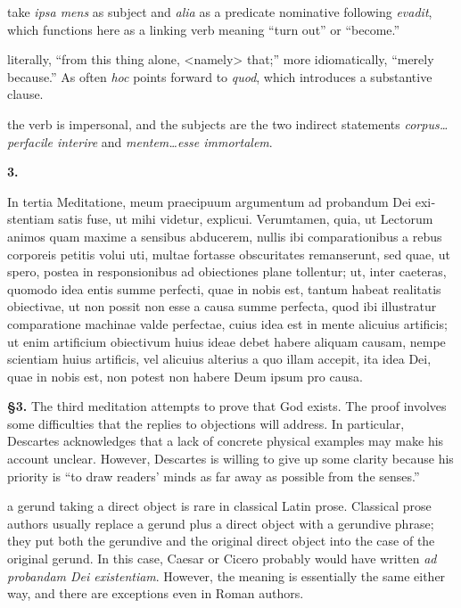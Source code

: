  take \textit{ipsa mens} as subject and \textit{alia} as a predicate nominative following \textit{evadit}, which functions here as a linking verb meaning ``turn out'' or ``become.''

 literally, ``from this thing alone, <namely> that;'' more idiomatically, ``merely because.'' As often \textit{hoc} points forward to \textit{quod}, which introduces a substantive clause.

 the verb is impersonal, and the subjects are the two indirect statements \textit{corpus\dots perfacile interire} and \textit{mentem\dots esse immortalem}.

\clearpage

\beginnumbering
\pstart
\textbf{3.} \begin{latin}In tertia Meditatione, meum praecipuum argumentum ad probandum Dei existentiam satis fuse, ut mihi videtur, explicui. Verumtamen, quia, ut Lectorum animos quam maxime a sensibus abducerem, nullis ibi comparationibus a rebus corporeis petitis volui uti, multae fortasse obscuritates remanserunt, sed quae, ut spero, postea in responsionibus ad obiectiones plane tollentur; ut, inter caeteras, quomodo idea entis summe perfecti, quae in nobis est, tantum habeat realitatis obiectivae, ut non possit non esse a causa summe perfecta, quod ibi illustratur comparatione machinae valde perfectae, cuius idea est in mente alicuius artificis; ut enim artificium obiectivum huius ideae debet habere aliquam causam, nempe scientiam huius artificis, vel alicuius alterius a quo illam accepit, ita  idea Dei, quae in nobis est, non potest non habere Deum ipsum pro causa.\end{latin}
\pend
\endnumbering

\prenotes

\textbf{§3.} The third meditation attempts to prove that God exists. The proof involves some difficulties that the replies to objections will address. In particular, Descartes acknowledges that a lack of concrete physical examples may make his account unclear. However, Descartes is willing to give up some clarity because his priority is ``to draw readers' minds as far away as possible from the senses.''

 a gerund taking a direct object is rare in classical Latin prose. Classical prose authors usually replace a gerund plus a direct object with a gerundive phrase; they put both the gerundive and the original direct object into the case of the original gerund. In this case, Caesar or Cicero probably would have written \textit{ad probandam Dei existentiam}. However, the meaning is essentially the same either way, and there are exceptions even in Roman authors.

